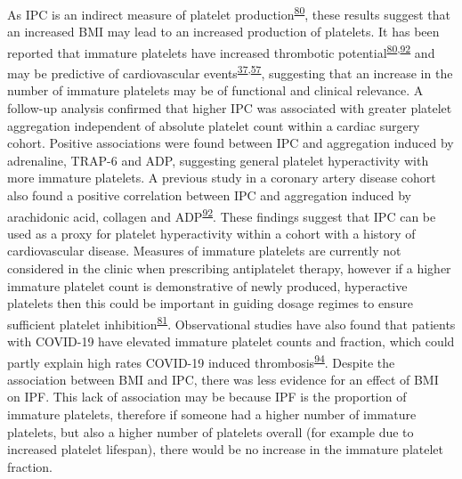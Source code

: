\documentclass[11pt,twoside]{bristolthesis}
\begin{document}
As IPC is an indirect measure of platelet production\textsuperscript{\protect\hyperlink{ref-Lev2016a}{80}}, these results suggest that an increased BMI may lead to an increased production of platelets. It has been reported that immature platelets have increased thrombotic potential\textsuperscript{\protect\hyperlink{ref-Lev2016a}{80},\protect\hyperlink{ref-Grove2011a}{92}} and may be predictive of cardiovascular events\textsuperscript{\protect\hyperlink{ref-Freynhofer2017a}{37},\protect\hyperlink{ref-Ibrahim2014}{57}}, suggesting that an increase in the number of immature platelets may be of functional and clinical relevance. A follow-up analysis confirmed that higher IPC was associated with greater platelet aggregation independent of absolute platelet count within a cardiac surgery cohort. Positive associations were found between IPC and aggregation induced by adrenaline, TRAP-6 and ADP, suggesting general platelet hyperactivity with more immature platelets. A previous study in a coronary artery disease cohort also found a positive correlation between IPC and aggregation induced by arachidonic acid, collagen and ADP\textsuperscript{\protect\hyperlink{ref-Grove2011a}{92}}. These findings suggest that IPC can be used as a proxy for platelet hyperactivity within a cohort with a history of cardiovascular disease. Measures of immature platelets are currently not considered in the clinic when prescribing antiplatelet therapy, however if a higher immature platelet count is demonstrative of newly produced, hyperactive platelets then this could be important in guiding dosage regimes to ensure sufficient platelet inhibition\textsuperscript{\protect\hyperlink{ref-Bernlochner2015a}{81}}. Observational studies have also found that patients with COVID-19 have elevated immature platelet counts and fraction, which could partly explain high rates COVID-19 induced thrombosis\textsuperscript{\protect\hyperlink{ref-Klok2020}{94}}. Despite the association between BMI and IPC, there was less evidence for an effect of BMI on IPF. This lack of association may be because IPF is the proportion of immature platelets, therefore if someone had a higher number of immature platelets, but also a higher number of platelets overall (for example due to increased platelet lifespan), there would be no increase in the immature platelet fraction.
\end{document}
